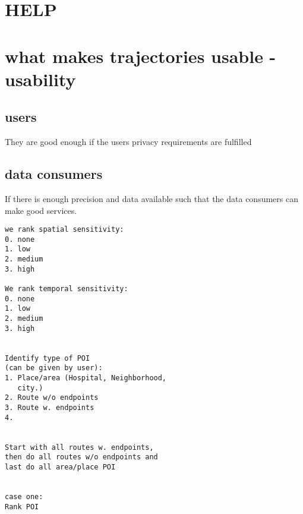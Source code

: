 \section{HELP}




% 
% 
% 

\section{what makes trajectories usable - usability}

\subsection{users}
They are good enough if the users privacy requirements are fulfilled

\subsection{data consumers}

If there is enough precision and data available such that the data consumers can make good services.







\begin{verbatim}
we rank spatial sensitivity:
0. none
1. low
2. medium
3. high

We rank temporal sensitivity:
0. none
1. low
2. medium
3. high


Identify type of POI 
(can be given by user):
1. Place/area (Hospital, Neighborhood, 
   city.)
2. Route w/o endpoints
3. Route w. endpoints
4. 


Start with all routes w. endpoints, 
then do all routes w/o endpoints and 
last do all area/place POI


case one:
Rank POI
\end{verbatim}














